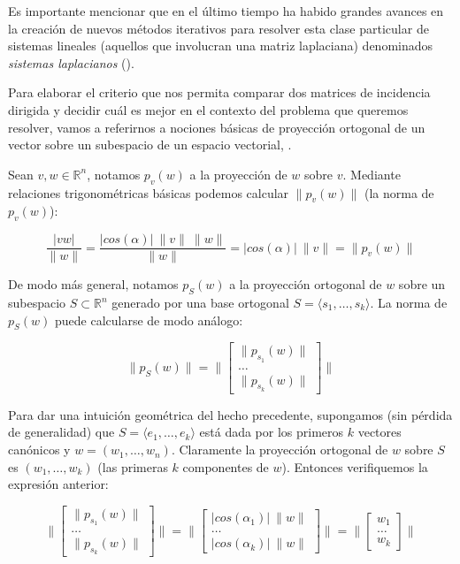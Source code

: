 \documentclass[conference,compsoc,a4paper]{IEEEtran}
\begin{document}
\smallskip

Es importante mencionar que en el último 
tiempo ha habido grandes avances en la creación de nuevos métodos 
iterativos para resolver esta clase particular de sistemas lineales 
(aquellos que involucran una matriz laplaciana) denominados 
\textit{sistemas laplacianos} (\cite{KMP:2010,Spielman:2010,ST:2004,
Teng:2010}).

\bigskip


Para elaborar el criterio que nos permita comparar dos matrices de 
incidencia dirigida y decidir cuál es mejor en el contexto del problema 
que queremos resolver, vamos a referirnos a nociones básicas de 
proyección ortogonal de un vector sobre un subespacio de un espacio 
vectorial, \cite{WK:2009}.

\smallskip

Sean $v,w \in \mathbb{R}^n$, notamos $p_v(w)$ a la proyección de $w$ 
sobre $v$. Mediante relaciones trigonométricas básicas podemos 
calcular $\|p_v(w)\|$ (la norma de $p_v(w)$):

$$\frac{|v w|}{\|w\|} = \frac{|cos(\alpha)| \ \|v\| \ \|w\|}{\|w\|} = 
|cos(\alpha)| \ \|v\| = \|p_v(w)\|$$

De modo más general, notamos $p_S(w)$ a la proyección ortogonal de $w$
sobre un subespacio $S \subset \mathbb{R}^n$ generado por una base 
ortogonal $S = \langle s_1, \dots, s_k\rangle $. La norma de $p_S(w)$ puede calcularse
de modo análogo:

$$
\|p_S(w)\| = \|\begin{bmatrix}
	\|p_{s_1}(w)\| \\
	\dots \\
	\|p_{s_k}(w)\|
\end{bmatrix}\|
$$

\smallskip

Para dar una intuición geométrica del hecho precedente, supongamos (sin 
pérdida de generalidad) que $S = \langle e_1, \dots, e_k\rangle $ está dada por los 
primeros $k$ vectores canónicos y $w = (w_1, \dots, w_n)$. 
Claramente la proyección ortogonal de $w$ sobre $S$ es 
$(w_1, \dots, w_k)$ (las primeras $k$ componentes de $w$). Entonces 
verifiquemos la expresión anterior:

$$
\|\begin{bmatrix}
	\|p_{s_1}(w)\| \\	
	\dots \\
	\|p_{s_k}(w)\|
\end{bmatrix}\| = 
\|\begin{bmatrix}
	|cos(\alpha_1)| \ \|w\| \\
	\dots \\
	|cos(\alpha_k)| \ \|w\|
\end{bmatrix}\| = 
\|\begin{bmatrix}
	w_1 \\
	\dots \\
	w_k
\end{bmatrix}\|
$$
\end{document}
